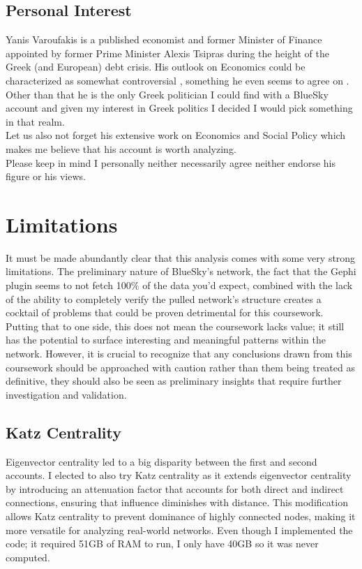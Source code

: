 \documentclass[
	a4paper, %
	12pt, %
	twoside, %
]{LTJournalArticle}
\begin{document}
\subsection{Personal Interest}
Yanis Varoufakis is a published economist and former Minister of Finance appointed by former Prime Minister Alexis Tsipras during the height of the Greek (and European) debt crisis. His outlook on Economics could be characterized as somewhat controversial \autocite{fink2015f}, something he even seems to agree on  \autocite{varoufakis2002critics}. Other than that he is the only Greek politician I could find with a BlueSky account and given my interest in Greek politics I decided I would pick something in that realm. \\ Let us also not forget his extensive work on Economics and Social Policy \autocite{varoufakis2012modern, varoufakis2002foundations, varoufakis2017talking} which makes me believe that his account is worth analyzing. \\ Please keep in mind I personally neither necessarily agree neither endorse his figure or his views.

\section{Limitations}
It must be made abundantly clear that this analysis comes with some very strong limitations. The preliminary nature of BlueSky’s network, the fact that the Gephi plugin seems to not fetch 100\% of the data you’d expect, combined with the lack of the ability to completely verify the pulled network’s structure creates a cocktail of problems that could be proven detrimental for this coursework. Putting that to one side, this does not mean the coursework lacks value; it still has the potential to surface interesting and meaningful patterns within the network. However, it is crucial to recognize that any conclusions drawn from this coursework should be approached with caution rather than them being treated as definitive, they should also be seen as preliminary insights that require further investigation and validation.

\subsection{Katz Centrality}
Eigenvector centrality led to a big disparity between the first and second accounts. I elected to also try Katz centrality as it extends eigenvector centrality by introducing an attenuation factor that accounts for both direct and indirect connections, ensuring that influence diminishes with distance. This modification allows Katz centrality to prevent dominance of highly connected nodes, making it more versatile for analyzing real-world networks. Even though I implemented the code; it required 51GB of RAM to run, I only have 40GB so it was never computed.
\end{document}
